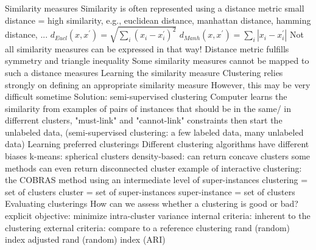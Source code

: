 \begin{outline}
    \1 Similarity measures
        \2 Similarity is often represented using a distance metric
            \3 small distance = high similarity, e.g., euclidean distance, manhattan distance, hamming distance, ...
            \3 $d_{Eucl}(x,x^{\prime}) = \sqrt{\sum_{i} (x_{i}-x_{i}^{\prime})^{2}}$
            \3 $d_{Manh}(x,x^{\prime}) = \sum_{i} |x_{i} - x_{i}^{\prime}|$
        \2 Not all similarity measures can be expressed in that way!
            \3 Distance metric fulfills symmetry and triangle inequality
            \3 Some similarity measures cannot be mapped to such a distance measures
    \1 Learning the similarity measure
        \2 Clustering relies strongly on defining an appropriate similarity measure
        \2 However, this may be very difficult sometime
            \3 Solution: semi-supervised clustering
            \3 Computer learns the similarity from examples of pairs of instances that should be in the same/ in differrent clusters, "must-link" and "cannot-link" constraints
            \3 then start the unlabeled data, (semi-supervised clustering: a few labeled data, many unlabeled data)
    \1 Learning preferred clusterings
        \2 Different clustering algorithms have different biases
            \3 k-means: spherical clusters
            \3 density-based: can return concave clusters
            \3 some methods can even return disconnected cluster
    \1 example of interactive clustering: the COBRAS method
        \2 using an intermediate level of super-instances
            \3 clustering = set of clusters
            \3 cluster = set of super-instances
            \3 super-instance = set of clusters
    \1 Evaluating clusterings
        \2 How can we assess whether a clustering is good or bad?
        \2 explicit objective: minimize intra-cluster variance
        \2 internal criteria: inherent to the clustering
        \2 external criteria: compare to a reference clustering
            \3 rand (random) index
            \3 adjusted rand (random) index (ARI)
\end{outline}
\pagebreak
